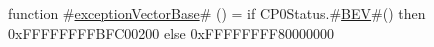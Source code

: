 function #\hyperref[sailMIPSzexceptionVectorBase]{exceptionVectorBase}# () =
  if CP0Status.#\hyperref[sailMIPSzBEV]{BEV}#() then
   0xFFFFFFFFBFC00200
  else
   0xFFFFFFFF80000000
